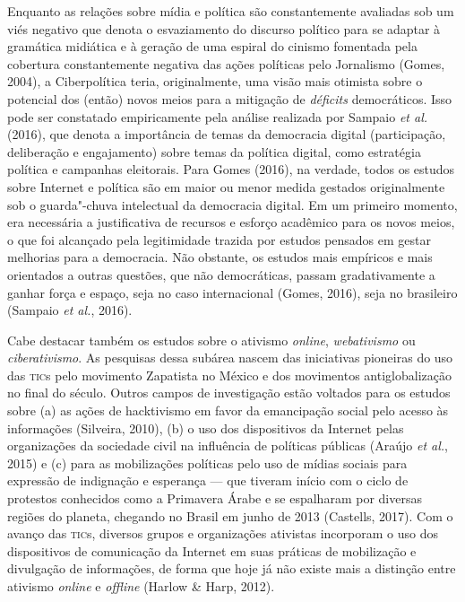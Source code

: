 Enquanto as relações sobre mídia e política são constantemente avaliadas
sob um viés negativo que denota o esvaziamento do discurso político para
se adaptar à gramática midiática e à geração de uma espiral do cinismo
fomentada pela cobertura constantemente negativa das ações políticas
pelo Jornalismo (Gomes, 2004), a Ciberpolítica teria, originalmente, uma
visão mais otimista sobre o potencial dos (então) novos meios para a
mitigação de \emph{déficits} democráticos. Isso pode ser constatado
empiricamente pela análise realizada por Sampaio \emph{et al.} (2016),
que denota a importância de temas da democracia digital (participação,
deliberação e engajamento) sobre temas da política digital, como
estratégia política e campanhas eleitorais. Para Gomes (2016), na
verdade, todos os estudos sobre Internet e política são em maior ou
menor medida gestados originalmente sob o guarda"-chuva intelectual da
democracia digital. Em um primeiro momento, era necessária a
justificativa de recursos e esforço acadêmico para os novos meios, o que
foi alcançado pela legitimidade trazida por estudos pensados em gestar
melhorias para a democracia. Não obstante, os estudos mais empíricos e
mais orientados a outras questões, que não democráticas, passam
gradativamente a ganhar força e espaço, seja no caso internacional
(Gomes, 2016), seja no brasileiro (Sampaio \emph{et al.}, 2016).

Cabe destacar também os estudos sobre o ativismo \emph{online},
\emph{webativismo} ou \emph{ciberativismo}. As pesquisas dessa subárea
nascem das iniciativas pioneiras do uso das \textsc{tic}s pelo movimento
Zapatista no México e dos movimentos antiglobalização no final do
século. Outros campos de investigação estão voltados para os estudos
sobre (a) as ações de hacktivismo em favor da emancipação social pelo
acesso às informações (Silveira, 2010), (b) o uso dos dispositivos da
Internet pelas organizações da sociedade civil na influência de
políticas públicas (Araújo \emph{et al.}, 2015) e (c) para as
mobilizações políticas pelo uso de mídias sociais para expressão de
indignação e esperança --- que tiveram início com o ciclo de protestos
conhecidos como a Primavera Árabe e se espalharam por diversas regiões
do planeta, chegando no Brasil em junho de 2013 (Castells, 2017). Com o
avanço das \textsc{tic}s, diversos grupos e organizações ativistas incorporam o
uso dos dispositivos de comunicação da Internet em suas práticas de
mobilização e divulgação de informações, de forma que hoje já não existe
mais a distinção entre ativismo \emph{online} e \emph{offline} (Harlow
\& Harp, 2012).

